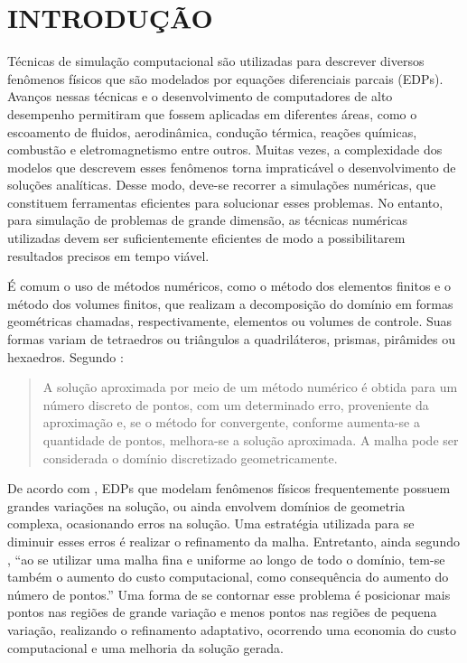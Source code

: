 \section{INTRODUÇÃO}

Técnicas de simulação computacional são utilizadas para descrever diversos fenômenos físicos que são modelados por equações diferenciais parcais (EDPs). Avanços nessas técnicas e o desenvolvimento de computadores de alto desempenho permitiram que fossem aplicadas em diferentes áreas, como o escoamento de fluidos, aerodinâmica, condução térmica, reações químicas, combustão e eletromagnetismo entre outros. Muitas vezes, a complexidade dos modelos que descrevem esses fenômenos torna impraticável o desenvolvimento de soluções analíticas. Desse modo, deve-se recorrer a simulações numéricas, que constituem ferramentas eficientes para solucionar esses problemas. No entanto, para simulação de problemas de grande dimensão, as técnicas numéricas utilizadas devem ser suficientemente eficientes de modo a possibilitarem resultados precisos em tempo viável.

É comum o uso de métodos numéricos, como o método dos elementos finitos e o método dos volumes finitos, que realizam a decomposição do domínio em formas geométricas chamadas, respectivamente, elementos ou volumes de controle. Suas formas variam de tetraedros ou triângulos a quadriláteros, prismas, pirâmides ou hexaedros. Segundo :

\begin{quotation} 
A solução aproximada por meio de um método numérico é obtida para um número discreto de pontos, com um determinado erro, proveniente da aproximação e, se o método for convergente, conforme aumenta-se a quantidade de pontos, melhora-se a solução aproximada. A malha pode ser considerada o domínio discretizado geometricamente.
\end{quotation}

De acordo com , EDPs que modelam fenômenos físicos frequentemente possuem grandes variações na solução, ou ainda envolvem domínios de geometria complexa, ocasionando erros na solução. Uma estratégia utilizada para se diminuir esses erros é realizar o refinamento da malha. Entretanto, ainda segundo , ``ao se utilizar uma malha fina e uniforme ao longo de todo o domínio, tem-se também o aumento do custo computacional, como consequência do aumento do número de pontos.'' Uma forma de se contornar esse problema é posicionar mais pontos nas regiões de grande variação e menos pontos nas regiões de pequena variação, realizando o refinamento adaptativo, ocorrendo uma economia do custo computacional e uma melhoria da solução gerada. 

